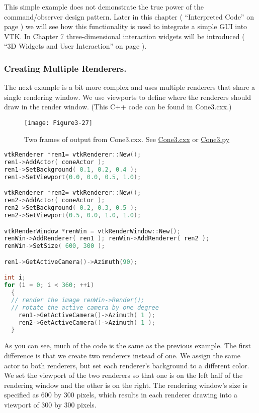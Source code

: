 This simple example does not demonstrate the true power of the command/observer design pattern. Later in this chapter ( ``Interpreted Code'' on page \pageref{pg:ic} ) we will see how this functionality is used to integrate a simple GUI into VTK. In Chapter 7 three-dimensional interaction widgets will be introduced ( ``\gls{3D Widget}s and User Interaction''  on page \pageref{sec:3dwui} ).

\subsubsection{Creating Multiple Renderers.}
The next example is a bit more complex and uses multiple renderers that share a single rendering window. We use viewports to define where the renderers should draw in the render window. (This C++ code can be found in Cone3.cxx.)

\begin{figure}[!htb]
  \centering
  \texttt{[image: Figure3-27]}\\
  \caption{Two frames of output from Cone3.cxx. See  \href{https://lorensen.github.io/VTKExamples/site/Cxx/Rendering/Cone3/}{Cone3.cxx} or \href{https://lorensen.github.io/VTKExamples/site/Python/Rendering/Cone3/}{Cone3.py}}\label{fig:Figure3-27}
\end{figure}

\begin{lstlisting}[language=C++, caption={Cone3.cxx}]
vtkRenderer *ren1= vtkRenderer::New();
ren1->AddActor( coneActor );
ren1->SetBackground( 0.1, 0.2, 0.4 );
ren1->SetViewport(0.0, 0.0, 0.5, 1.0);

vtkRenderer *ren2= vtkRenderer::New();
ren2->AddActor( coneActor );
ren2->SetBackground( 0.2, 0.3, 0.5 );
ren2->SetViewport(0.5, 0.0, 1.0, 1.0);

vtkRenderWindow *renWin = vtkRenderWindow::New();
renWin->AddRenderer( ren1 ); renWin->AddRenderer( ren2 );
renWin->SetSize( 600, 300 );

ren1->GetActiveCamera()->Azimuth(90);

int i;
for (i = 0; i < 360; ++i)
  {
  // render the image renWin->Render();
  // rotate the active camera by one degree
    ren1->GetActiveCamera()->Azimuth( 1 );
    ren2->GetActiveCamera()->Azimuth( 1 );
  }
\end{lstlisting}

As you can see, much of the code is the same as the previous example. The first difference is that we create two renderers instead of one. We assign the same actor to both renderers, but set each renderer's background to a different color. We set the viewport of the two renderers so that one is on the left half of the rendering window and the other is on the right. The rendering window's size is specified as 600 by 300 pixels, which results in each renderer drawing into a viewport of 300 by 300 pixels.

